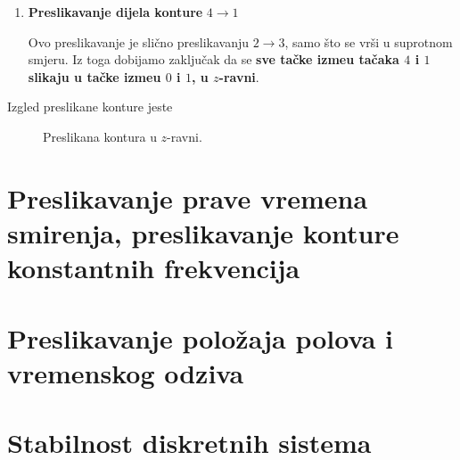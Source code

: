 \documentclass[12pt]{IEEEtran}
\numberwithin{equation}{subsection}
\numberwithin{figure}{section}
\begin{document}
\begin{enumerate}
    Realni dio svakog kompleksnog broja koji se nalazi izme\dj{}u 
    ta\v{c}aka $3$ i $4$ jeste $-\infty$, \v{s}to \'{c}e
    zna\v{c}iti da \'{c}e moduo kompleksne promjenljive $z$ biti $0$. 
    
    Dakle, preslikavanjem dijela $3 \to 4$ \textbf{sve ta\v{c}ke se slikaju 
    u koordinatni po\v{c}etak}. 

    \item \textbf{Preslikavanje dijela konture} $4 \to 1$
    
    Ovo preslikavanje je sli\v{c}no preslikavanju $2 \to 3$, samo 
    \v{s}to se vr\v{s}i u suprotnom smjeru. Iz toga dobijamo zaklju\v{c}ak da 
    se \textbf{sve ta\v{c}ke izme\dj{}u ta\v{c}aka $4$ i $1$ slikaju
    u ta\v{c}ke izme\dj{}u $0$ i $1$, u $z$-ravni}.

\end{enumerate}

Izgled preslikane konture jeste 

\begin{figure}[h]
    \centering
    \caption{Preslikana kontura u $z$-ravni.}
\end{figure}

\newpage
\section{\textbf{Preslikavanje prave vremena smirenja, preslikavanje konture konstantnih frekvencija}}

\newpage
\section{\textbf{Preslikavanje polo\v{z}aja polova i vremenskog odziva}}

\newpage
\section{\textbf{Stabilnost diskretnih sistema}}
\end{document}
